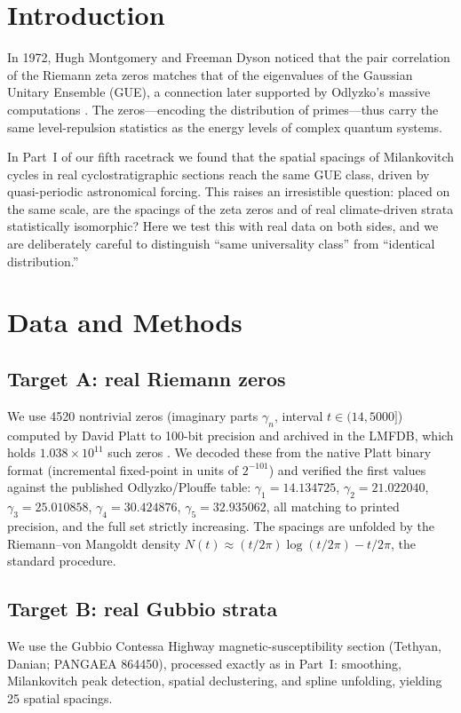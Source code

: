 \documentclass[12pt,a4paper]{article}
\begin{document}
\section{Introduction}

In 1972, Hugh Montgomery and Freeman Dyson noticed that the pair correlation of the Riemann zeta zeros matches that of the eigenvalues of the Gaussian Unitary Ensemble (GUE), a connection later supported by Odlyzko's massive computations \citep{montgomery1973,odlyzko1987}. The zeros---encoding the distribution of primes---thus carry the same level-repulsion statistics as the energy levels of complex quantum systems.

In Part~I of our fifth racetrack \citep{chen2026spatial} we found that the spatial spacings of Milankovitch cycles in real cyclostratigraphic sections reach the same GUE class, driven by quasi-periodic astronomical forcing. This raises an irresistible question: placed on the same scale, are the spacings of the zeta zeros and of real climate-driven strata statistically isomorphic? Here we test this with real data on both sides, and we are deliberately careful to distinguish ``same universality class'' from ``identical distribution.''

\section{Data and Methods}

\subsection{Target A: real Riemann zeros}
We use 4520 nontrivial zeros (imaginary parts $\gamma_n$, interval $t\in(14,5000]$) computed by David Platt to 100-bit precision and archived in the LMFDB, which holds $1.038\times10^{11}$ such zeros \citep{lmfdb,platt2021}. We decoded these from the native Platt binary format (incremental fixed-point in units of $2^{-101}$) and verified the first values against the published Odlyzko/Plouffe table: $\gamma_1=14.134725$, $\gamma_2=21.022040$, $\gamma_3=25.010858$, $\gamma_4=30.424876$, $\gamma_5=32.935062$, all matching to printed precision, and the full set strictly increasing. The spacings are unfolded by the Riemann--von Mangoldt density $N(t)\approx (t/2\pi)\log(t/2\pi)-t/2\pi$, the standard procedure.

\subsection{Target B: real Gubbio strata}
We use the Gubbio Contessa Highway magnetic-susceptibility section (Tethyan, Danian; PANGAEA 864450), processed exactly as in Part~I: smoothing, Milankovitch peak detection, spatial declustering, and spline unfolding, yielding 25 spatial spacings.
\end{document}
